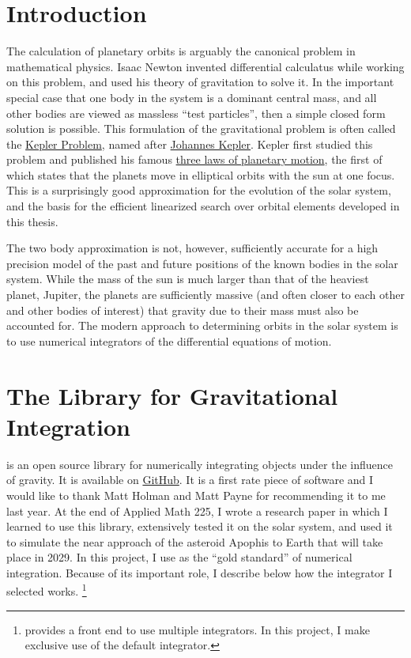 \section{Introduction}
\label{section_intro}
The calculation of planetary orbits is arguably the canonical problem in mathematical physics.
Isaac Newton invented differential calculatus while working on this problem, and used his theory of gravitation to solve it.
In the important special case that one body in the system is a dominant central mass,
and all other bodies are viewed as massless ``test particles'', then a simple closed form solution is possible.
This formulation of the gravitational problem is often called the \href{https://en.wikipedia.org/wiki/Kepler_problem}{Kepler Problem},
named after \href{https://en.wikipedia.org/wiki/Johannes_Kepler}{Johannes Kepler}.
Kepler first studied this problem and published his famous \href{https://en.wikipedia.org/wiki/Kepler\%27s_laws_of_planetary_motion}{three laws of planetary motion},
the first of which states that the planets move in elliptical orbits with the sun at one focus.
This is a surprisingly good approximation for the evolution of the solar system, and the basis for the efficient linearized search over orbital elements developed in this thesis.

The two body approximation is not, however, sufficiently accurate for a high precision model of the past and future positions of the known bodies in the solar system.
While the mass of the sun is much larger than that of the heaviest planet, Jupiter, the planets are sufficiently massive
(and often closer to each other and other bodies of interest) that gravity due to their mass must also be accounted for.
The modern approach to determining orbits in the solar system is to use numerical integrators of the differential equations of motion.

\section{The  Library for Gravitational Integration}
\label{section_rebound}
 is an open source library for numerically integrating objects under the influence of gravity.
It is available on \href{https://github.com/hannorein/rebound}{GitHub}.
It is a first rate piece of software and I would like to thank Matt Holman and Matt Payne for recommending it to me last year.
At the end of Applied Math 225, I wrote a research paper in which I learned to use this library, 
extensively tested it on the solar system, and used it to simulate the near approach of the asteroid Apophis to Earth that will take place in 2029.
In this project, I use  as the ``gold standard'' of numerical integration.
Because of its important role, I describe below how the  integrator I selected works.
\footnote{ provides a front end to use multiple integrators. In this project, I make exclusive use of the default  integrator.}

